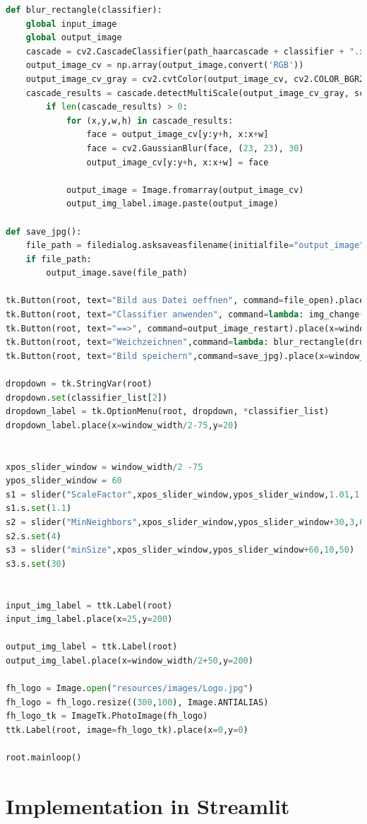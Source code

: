 \documentclass{article}
\begin{document}
\begin{lstlisting}[language=Python]
def blur_rectangle(classifier):
	global input_image
	global output_image
	cascade = cv2.CascadeClassifier(path_haarcascade + classifier + ".xml")
	output_image_cv = np.array(output_image.convert('RGB'))
	output_image_cv_gray = cv2.cvtColor(output_image_cv, cv2.COLOR_BGR2GRAY)
	cascade_results = cascade.detectMultiScale(output_image_cv_gray, scaleFactor=s1.get_val(), minNeighbors = s2.get_val(), minSize=(s3.get_val(), s3.get_val()))
		if len(cascade_results) > 0:
			for (x,y,w,h) in cascade_results:
				face = output_image_cv[y:y+h, x:x+w]
				face = cv2.GaussianBlur(face, (23, 23), 30)
				output_image_cv[y:y+h, x:x+w] = face

			output_image = Image.fromarray(output_image_cv)
			output_img_label.image.paste(output_image)

def save_jpg():
	file_path = filedialog.asksaveasfilename(initialfile="output_image", filetypes=(("jpg files", "*.jpg"),("png files", "*.png")), defaultextension=".jpeg")
	if file_path:
		output_image.save(file_path)

tk.Button(root, text="Bild aus Datei oeffnen", command=file_open).place(x=window_width/2-window_width/4,y=150)
tk.Button(root, text="Classifier anwenden", command=lambda: img_change(dropdown.get())).place(x=window_width/2+window_width/4,y=150)
tk.Button(root, text="==>", command=output_image_restart).place(x=window_width/2-12.5,y=window_height/2)
tk.Button(root, text="Weichzeichnen",command=lambda: blur_rectangle(dropdown.get())).place(x=window_width/2+window_width/4+122,y=150)
tk.Button(root, text="Bild speichern",command=save_jpg).place(x=window_width/2+window_width/4+220,y=150)

dropdown = tk.StringVar(root)
dropdown.set(classifier_list[2])
dropdown_label = tk.OptionMenu(root, dropdown, *classifier_list)
dropdown_label.place(x=window_width/2-75,y=20)


xpos_slider_window = window_width/2 -75
ypos_slider_window = 60
s1 = slider("ScaleFactor",xpos_slider_window,ypos_slider_window,1.01,1.5,float)
s1.s.set(1.1)
s2 = slider("MinNeighbors",xpos_slider_window,ypos_slider_window+30,3,6)
s2.s.set(4)
s3 = slider("minSize",xpos_slider_window,ypos_slider_window+60,10,50)
s3.s.set(30)


input_img_label = ttk.Label(root)
input_img_label.place(x=25,y=200)

output_img_label = ttk.Label(root)
output_img_label.place(x=window_width/2+50,y=200)

fh_logo = Image.open("resources/images/Logo.jpg")
fh_logo = fh_logo.resize((300,100), Image.ANTIALIAS)
fh_logo_tk = ImageTk.PhotoImage(fh_logo)
ttk.Label(root, image=fh_logo_tk).place(x=0,y=0)

root.mainloop()	
\end{lstlisting}







\newpage
\section{Implementation in Streamlit}
\end{document}
